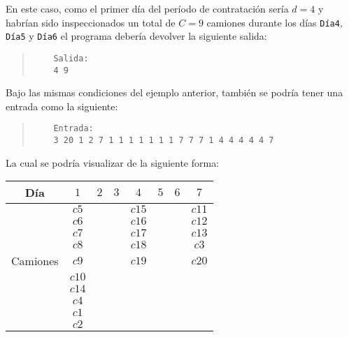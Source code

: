 \documentclass[11pt, a4paper, twoside]{article}
\begin{document}
\begin{ejemplo}
    En este caso, como el primer día del período de contratación sería $d=4$ y habrían sido
    inspeccionados un total de $C=9$ camiones durante los días \texttt{Día4}, \texttt{Día5} 
    y \texttt{Día6} el programa debería devolver la siguiente salida: 

  \begin{quote}
    \begin{verbatim}
    Salida:
    4 9
    \end{verbatim}
  \end{quote}

\end{ejemplo}

\begin{ejemplo}\hspace{0em}

Bajo las mismas condiciones del ejemplo anterior, también 
se podría tener una entrada como la siguiente:

  \begin{quote}
    \begin{verbatim}
    Entrada:
    3 20 1 2 7 1 1 1 1 1 1 1 7 7 7 1 4 4 4 4 4 7
    \end{verbatim}
  \end{quote}

  \vspace{-2em}
  \begin{center}
    La cual se podría visualizar de la siguiente forma:
    
    \renewcommand{\arraystretch}{1.2} %
    \begin{tabular}{|c|c|c|c|c|c|c|c|}
      \hline
      Día          &  $1$  & $2$   & $3$   & $4$    & $5$ & $6$ & $7$   \\
      \hline
                     &  $c5$ &       &       & $c15$  &     &     & $c11$ \\
                     &  $c6$ &       &       & $c16$  &     &     & $c12$ \\    
                     &  $c7$ &       &       & $c17$  &     &     & $c13$ \\  
                     &  $c8$ &       &       & $c18$  &     &     & $c3$  \\
      Camiones     &  $c9$ &       &       & $c19$  &     &     & $c20$ \\
                     &  $c10$&       &       &        &     &     &       \\
                     &  $c14$&       &       &        &     &     &       \\
                     &  $c4$ &       &       &        &     &     &       \\
                     &  $c1$ &       &       &        &     &     &       \\
                     &  $c2$ &       &       &        &     &     &       \\
      \hline
    \end{tabular}
  \end{center}


\end{ejemplo}
\end{document}
